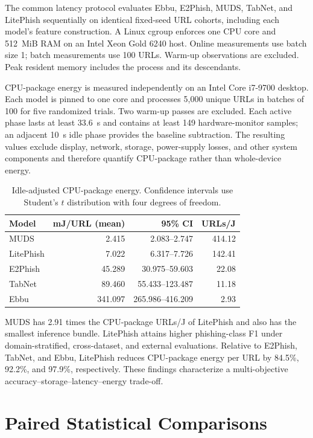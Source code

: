 \documentclass[10pt]{article}
\begin{document}
The common latency protocol evaluates Ebbu, E2Phish, MUDS, TabNet, and LitePhish sequentially on identical fixed-seed URL cohorts, including each model's feature construction. A Linux cgroup enforces one CPU core and 512~MiB RAM on an Intel Xeon Gold 6240 host. Online measurements use batch size 1; batch measurements use 100 URLs. Warm-up observations are excluded. Peak resident memory includes the process and its descendants.

CPU-package energy is measured independently on an Intel Core i7-9700 desktop. Each model is pinned to one core and processes 5,000 unique URLs in batches of 100 for five randomized trials. Two warm-up passes are excluded. Each active phase lasts at least 33.6~s and contains at least 149 hardware-monitor samples; an adjacent 10~s idle phase provides the baseline subtraction. The resulting values exclude display, network, storage, power-supply losses, and other system components and therefore quantify CPU-package rather than whole-device energy.

\begin{table}[ht]
\centering
\caption{Idle-adjusted CPU-package energy. Confidence intervals use Student's $t$ distribution with four degrees of freedom.}
\begin{tabular}{lrrr}
\toprule
Model & mJ/URL (mean) & 95\% CI & URLs/J \\
\midrule
MUDS & 2.415 & 2.083--2.747 & 414.12 \\
LitePhish & 7.022 & 6.317--7.726 & 142.41 \\
E2Phish & 45.289 & 30.975--59.603 & 22.08 \\
TabNet & 89.460 & 55.433--123.487 & 11.18 \\
Ebbu & 341.097 & 265.986--416.209 & 2.93 \\
\bottomrule
\end{tabular}
\end{table}

MUDS has 2.91 times the CPU-package URLs/J of LitePhish and also has the smallest inference bundle. LitePhish attains higher phishing-class F1 under domain-stratified, cross-dataset, and external evaluations. Relative to E2Phish, TabNet, and Ebbu, LitePhish reduces CPU-package energy per URL by 84.5\%, 92.2\%, and 97.9\%, respectively. These findings characterize a multi-objective accuracy--storage--latency--energy trade-off.

\section{Paired Statistical Comparisons}
\end{document}

